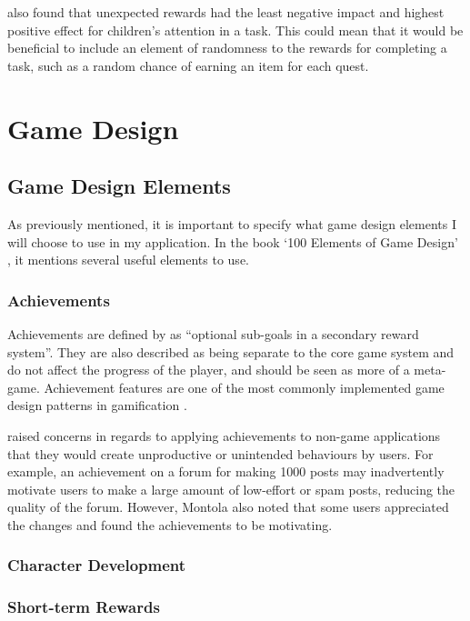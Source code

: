 \cite{deci2001extrinsic} also found that unexpected rewards had the least negative impact and highest positive effect for children's attention in a task. 
This could mean that it would be beneficial to include an element of randomness to the rewards for completing a task, such as a random chance of earning an item for each quest.



\section{Game Design}

\subsection{Game Design Elements}
As previously mentioned, it is important to specify what game design elements I will choose to use in my application.
In the book `100 Elements of Game Design' \citep{despain2012100}, it mentions several useful elements to use.

\subsubsection{Achievements}

Achievements are defined by \cite{Montola:2009:AGA:1621841.1621859} as ``optional sub-goals in a secondary reward system''. 
They are also described as being separate to the core game system and do not affect the progress of the player, and should be seen as more of a meta-game. Achievement features are one of the most commonly implemented game design patterns in gamification \citep{hamari2011framework}.

\cite{Montola:2009:AGA:1621841.1621859} raised concerns in regards to applying achievements to non-game applications that they would create unproductive or unintended behaviours by users. 
For example, an achievement on a forum for making 1000 posts may inadvertently motivate users to make a large amount of low-effort or spam posts, reducing the quality of the forum.
However, Montola also noted that some users appreciated the changes and found the achievements to be motivating. 

\subsubsection{Character Development}

\subsubsection{Short-term Rewards}

